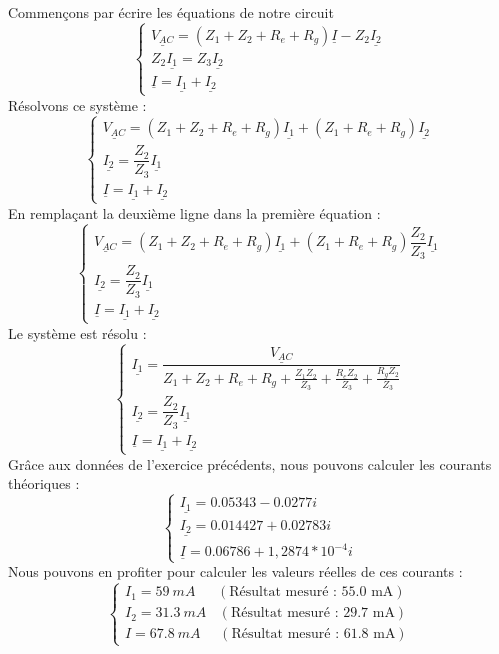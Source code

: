 \documentclass	[11pt, a4paper, openany]{book}
\begin{document}
Commençons par écrire les équations de notre circuit
\begin{equation}
\left\{\begin{array}{l}
\underline{V_{AC}} = (Z_1 + Z_2 + R_e + R_g)\underline{I} - Z_2\underline{I_2}\\
Z_2\underline{I_1} = Z_3\underline{I_2}\\
\underline{I} = \underline{I_1} +\underline{I_2}
\end{array}\right.
\end{equation}
Résolvons ce système :
\begin{equation}
\left\{\begin{array}{l}
\underline{V_{AC}} = (Z_1 + Z_2 + R_e + R_g)\underline{I_1} + (Z_1 + R_e + R_g)\underline{I_2}\\
\underline{I_2} = \dfrac{Z_2}{Z_3}\underline{I_1}\\
\underline{I} = \underline{I_1} +\underline{I_2}
\end{array}\right.
\end{equation}
En remplaçant la deuxième ligne dans la première équation :
\begin{equation}
\left\{\begin{array}{l}
\underline{V_{AC}} = (Z_1 +Z_2 +R_e + R_g)\underline{I_1} + (Z_1 + R_e + R_g)\dfrac{Z_2}{Z_3}\underline{I_1}\\
\underline{I_2} = \dfrac{Z_2}{Z_3}\underline{I_1}\\
\underline{I} = \underline{I_1} +\underline{I_2}
\end{array}\right.
\end{equation}
Le système est résolu :
\begin{equation}
\left\{\begin{array}{l}
\underline{I_1} = \dfrac{\underline{V_{AC}}}{Z_1 + Z_2 + R_e + R_g + \frac{Z_1Z_2}{Z_3} + \frac{R_eZ_2}{Z_3} + \frac{R_gZ_2}{Z_3}}\\
\underline{I_2} = \dfrac{Z_2}{Z_3}\underline{I_1}\\
\underline{I} = \underline{I_1} +\underline{I_2}
\end{array}\right.
\end{equation}
Grâce aux données de l'exercice précédents, nous pouvons calculer les courants théoriques : 
\begin{equation}
\left\{\begin{array}{l}
\underline{I_1} = 0.05343 - 0.0277i\\
\underline{I_2} = 0.014427 + 0.02783i\\
\underline{I} = 0.06786 + 1,2874*10^{-4}i
\end{array}\right.
\end{equation}
Nous pouvons en profiter pour calculer les valeurs réelles de ces courants : 
\begin{equation}
\left\{\begin{array}{l}
I_1 = 59\ mA\ \ \ \ \ \ \ (\text{Résultat mesuré : 55.0 mA})\\
I_2 = 31.3\ mA\ \ \ \ (\text{Résultat mesuré : 29.7 mA})\\
I = 67.8\ mA\ \ \ \ \ \ (\text{Résultat mesuré : 61.8 mA})
\end{array}\right.
\end{equation}
\end{document}

